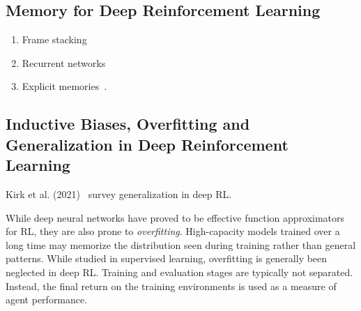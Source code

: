 \subsection{Memory for Deep Reinforcement Learning}

\begin{enumerate}
    \item Frame stacking
    \item Recurrent networks
    \item Explicit memories~\cite{oh_minecraft_2016,parisotto_salakhutdinov_2017}.
\end{enumerate}

\subsection{Inductive Biases, Overfitting and Generalization in Deep Reinforcement Learning}


Kirk et al. (2021)~\cite{kirk_survey_2022} survey generalization in deep RL.


While deep neural networks have proved to be effective function approximators for RL, they are also prone to \textit{overfitting}.
High-capacity models trained over a long time may memorize the distribution seen during training rather than general patterns.
While studied in supervised learning, overfitting is generally been neglected in deep RL.
Training and evaluation stages are typically not separated.
Instead, the final return on the training environments is used as a measure of agent performance.

